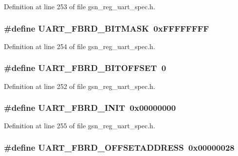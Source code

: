 Definition at line 253 of file gsn\_\-reg\_\-uart\_\-spec.h.

\hypertarget{a00575_a5f4f70e2fb44e713446b5a84aeed685a}{
\subsubsection[{UART\_\-FBRD\_\-BITMASK}]{\setlength{\rightskip}{0pt plus 5cm}\#define UART\_\-FBRD\_\-BITMASK~0xFFFFFFFF}}
\label{a00575_a5f4f70e2fb44e713446b5a84aeed685a}


Definition at line 254 of file gsn\_\-reg\_\-uart\_\-spec.h.

\hypertarget{a00575_ae804f1f1f6d9d81212af15f1c9f709e6}{
\subsubsection[{UART\_\-FBRD\_\-BITOFFSET}]{\setlength{\rightskip}{0pt plus 5cm}\#define UART\_\-FBRD\_\-BITOFFSET~0}}
\label{a00575_ae804f1f1f6d9d81212af15f1c9f709e6}


Definition at line 252 of file gsn\_\-reg\_\-uart\_\-spec.h.

\hypertarget{a00575_a69b539f2993654b603b9e50600c93fa1}{
\subsubsection[{UART\_\-FBRD\_\-INIT}]{\setlength{\rightskip}{0pt plus 5cm}\#define UART\_\-FBRD\_\-INIT~0x00000000}}
\label{a00575_a69b539f2993654b603b9e50600c93fa1}


Definition at line 255 of file gsn\_\-reg\_\-uart\_\-spec.h.

\hypertarget{a00575_a08bfcb8c515af301e8b15b83ea40900d}{
\subsubsection[{UART\_\-FBRD\_\-OFFSETADDRESS}]{\setlength{\rightskip}{0pt plus 5cm}\#define UART\_\-FBRD\_\-OFFSETADDRESS~0x00000028}}
\label{a00575_a08bfcb8c515af301e8b15b83ea40900d}


